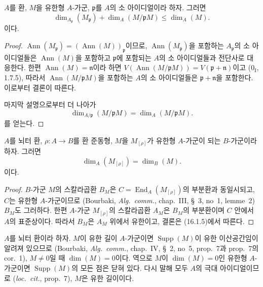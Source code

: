 \begin{proposition}[16.1.8]
\label{0.16.1.8-fr}
$A$를 환, $M$을 유한형 $A$-가군, $\mathfrak{p}$를 $A$의 소
아이디얼이라 하자. 그러면
\[
\label{0.16.1.8.1-fr}
  \dim_{A_{\mathfrak{p}}}(M_{\mathfrak{p}})
  +\dim_A(M/\mathfrak{p}M)\leq\dim_A(M).
\tag{16.1.8.1}
\]
이다.
\end{proposition}

\begin{proof}
$\operatorname{Ann}(M_{\mathfrak{p}})
=(\operatorname{Ann}(M))_{\mathfrak{p}}$이므로,
$\operatorname{Ann}(M_{\mathfrak{p}})$을 포함하는
$A_{\mathfrak{p}}$의 소 아이디얼들은 $\operatorname{Ann}(M)$을
포함하고 $\mathfrak{p}$에 포함되는 $A$의 소 아이디얼들과 전단사로
대응한다. 한편 $\operatorname{Ann}(M)=\mathfrak{n}$이라 하면
$V(\operatorname{Ann}(M/\mathfrak{p}M))
=V(\mathfrak{p}+\mathfrak{n})$이고 ($0_{\mathrm I}$, 1.7.5), 따라서
$\operatorname{Ann}(M/\mathfrak{p}M)$을 포함하는 $A$의 소
아이디얼들은 $\mathfrak{p}+\mathfrak{n}$을 포함한다. 이로부터 결론이
따른다.

마지막 설명으로부터 더 나아가
\[
\label{0.16.1.8.2-fr}
  \dim_{A/\mathfrak{p}}(M/\mathfrak{p}M)=\dim_A(M/\mathfrak{p}M).
\tag{16.1.8.2}
\]
를 얻는다.
\end{proof}

\begin{proposition}[16.1.9]
\label{0.16.1.9-fr}
$A$를 뇌터 환, $\rho:A\to B$를 환 준동형, $M$을
$M_{[\rho]}$가 유한형 $A$-가군이 되는 $B$-가군이라 하자. 그러면
\[
\label{0.16.1.9.1-fr}
  \dim_A(M_{[\rho]})=\dim_B(M).
\tag{16.1.9.1}
\]
이다.
\end{proposition}

\begin{proof}
$B$-가군 $M$의 스칼라곱환 $B_M$은
$C=\operatorname{End}_A(M_{[\rho]})$의 부분환과 동일시되고, $C$는
유한형 $A$-가군이므로 (Bourbaki, \emph{Alg.~comm.}, chap.~III,
\S~3, no~1, lemme~2) $B_M$도 그러하다. 한편 $A$-가군
$M_{[\rho]}$의 스칼라곱환 $A_M$은 $B_M$의 부분환이며 $C$ 안에서
$A$의 표준상이다. 따라서 $B_M$은 $A_M$ 위에서 유한이고, 결론은
(16.1.5)에서 따른다.
\end{proof}

\begin{env}[16.1.10]
\label{0.16.1.10-fr}
$A$를 뇌터 환이라 하자. $M$이 유한 길이 $A$-가군이면
$\operatorname{Supp}(M)$이 유한 이산공간임이 알려져 있으므로
(Bourbaki, \emph{Alg.~comm.}, chap.~IV, \S~2, no~5, prop.~7과
prop.~7의 cor.~1), $M\neq0$일 때 $\dim(M)=0$이다. 역으로 $M$이
$\dim(M)=0$인 유한형 $A$-가군이면 $\operatorname{Supp}(M)$의 모든
점은 닫혀 있다. 다시 말해 모두 $A$의 극대 아이디얼이므로
(\emph{loc.~cit.}, prop.~7), $M$은 유한 길이이다.
\end{env}

